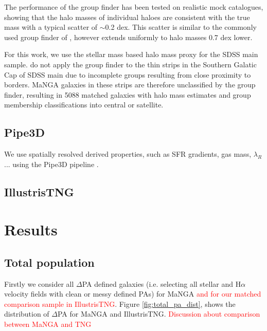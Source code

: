 \documentclass[fleqn,usenatbib]{mnras}
\newcommand{\red}[1]{{\textcolor{red}{#1}}}
\begin{document}
The performance of the group finder has been tested on realistic mock catalogues, showing that the halo masses of individual haloes are consistent with the true mass with a typical scatter of $\sim$0.2 dex. This scatter is similar to the commonly used group finder of \citet{yang2007}, however extends uniformly to halo masses 0.7 dex lower. 

For this work, we use the stellar mass based halo mass proxy for the SDSS main sample. \citet{lim2017} do not apply the group finder to the thin strips in the Southern Galatic Cap of SDSS main due to incomplete groups resulting from close proximity to borders. MaNGA galaxies in these strips are therefore unclassified by the group finder, resulting in 5088 matched galaxies with halo mass estimates and group membership classifications into central or satellite.

\subsection{Pipe3D}
We use spatially resolved derived properties, such as SFR gradients, gas mass, $\lambda_{R}$... using the Pipe3D pipeline \citep{pipe3Da,pipe3Dvac}.

\subsection{IllustrisTNG}

\section{Results}
\subsection{Total population}
Firstly we consider all $\Delta$PA defined galaxies (i.e. selecting all stellar and H$\alpha$ velocity fields with clean or messy defined PAs) for MaNGA \red{and for our matched comparison sample in IllustrisTNG}. Figure \ref{fig:total_pa_dist}, shows the distribution of $\Delta$PA for MaNGA and IllustrisTNG. \red{Discussion about comparison between MaNGA and TNG}
\end{document}
